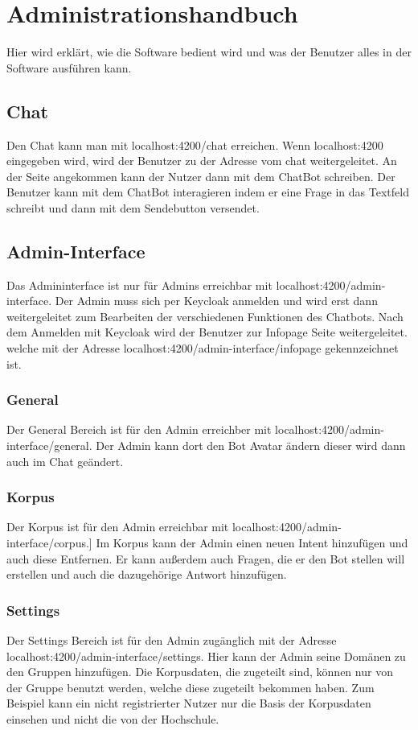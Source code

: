 \section{Administrationshandbuch}
Hier wird erklärt, wie die Software bedient wird und was der Benutzer alles 
in der Software ausführen kann.

\subsection{Chat}
Den Chat kann man mit localhost:4200/chat erreichen. Wenn localhost:4200
eingegeben wird, wird der Benutzer zu der Adresse vom chat weitergeleitet.
An der Seite angekommen kann der Nutzer dann mit dem ChatBot schreiben. 
Der Benutzer kann mit dem ChatBot interagieren indem er eine Frage in das Textfeld schreibt
und dann mit dem Sendebutton versendet.

\subsection{Admin-Interface}
Das Admininterface ist nur für Admins erreichbar mit localhost:4200/admin-interface. Der Admin muss sich per Keycloak
anmelden und wird erst dann weitergeleitet zum Bearbeiten der verschiedenen Funktionen
des Chatbots.
Nach dem Anmelden mit Keycloak wird der Benutzer zur Infopage Seite weitergeleitet.
welche mit der Adresse localhost:4200/admin-interface/infopage gekennzeichnet ist.

\subsubsection{General}
Der General Bereich ist für den Admin erreichber mit localhost:4200/admin-interface/general. 
Der Admin kann dort den Bot Avatar ändern dieser wird dann auch im Chat geändert.

\subsubsection{Korpus}
Der Korpus ist für den Admin erreichbar mit localhost:4200/admin-interface/corpus.]
Im Korpus kann der Admin einen neuen Intent hinzufügen und auch diese Entfernen. 
Er kann außerdem auch Fragen, die er den Bot stellen will erstellen und auch die 
dazugehörige Antwort hinzufügen.

\subsubsection{Settings}
Der Settings Bereich ist für den Admin zugänglich mit der Adresse 
localhost:4200/admin-interface/settings.
Hier kann der Admin seine Domänen zu den Gruppen hinzufügen. Die Korpusdaten, die zugeteilt sind,
können nur von der Gruppe benutzt werden, welche diese zugeteilt bekommen haben. 
Zum Beispiel kann ein nicht registrierter Nutzer nur die Basis der Korpusdaten einsehen und nicht die von der Hochschule.

